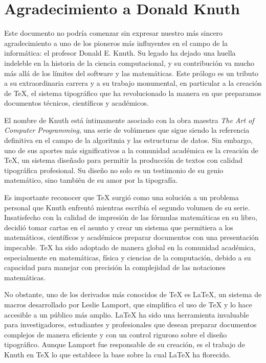
\chapter{Agradecimiento a Donald Knuth}

Este documento no podría comenzar sin expresar nuestro más sincero agradecimiento a uno de los pioneros más influyentes en el campo de la informática: el profesor Donald E. Knuth. Su legado ha dejado una huella indeleble en la historia de la ciencia computacional, y su contribución va mucho más allá de los límites del software y las matemáticas. Este prólogo es un tributo a su extraordinaria carrera y a su trabajo monumental, en particular a la creación de \TeX{}, el sistema tipográfico que ha revolucionado la manera en que preparamos documentos técnicos, científicos y académicos.

El nombre de Knuth está íntimamente asociado con la obra maestra \textit{The Art of Computer Programming}, una serie de volúmenes que sigue siendo la referencia definitiva en el campo de la algoritmia y las estructuras de datos. Sin embargo, uno de sus aportes más significativos a la comunidad académica es la creación de \TeX{}, un sistema diseñado para permitir la producción de textos con calidad tipográfica profesional. Su diseño no solo es un testimonio de su genio matemático, sino también de su amor por la tipografía.

Es importante reconocer que \TeX{} surgió como una solución a un problema personal que Knuth enfrentó mientras escribía el segundo volumen de su serie. Insatisfecho con la calidad de impresión de las fórmulas matemáticas en su libro, decidió tomar cartas en el asunto y crear un sistema que permitiera a los matemáticos, científicos y académicos preparar documentos con una presentación impecable. \TeX{} ha sido adoptado de manera global en la comunidad académica, especialmente en matemáticas, física y ciencias de la computación, debido a su capacidad para manejar con precisión la complejidad de las notaciones matemáticas.

No obstante, uno de los derivados más conocidos de \TeX{} es \LaTeX{}, un sistema de macros desarrollado por Leslie Lamport, que simplifica el uso de \TeX{} y lo hace accesible a un público más amplio. \LaTeX{} ha sido una herramienta invaluable para investigadores, estudiantes y profesionales que desean preparar documentos complejos de manera eficiente y con un control riguroso sobre el diseño tipográfico. Aunque Lamport fue responsable de su creación, es el trabajo de Knuth en \TeX{} lo que establece la base sobre la cual \LaTeX{} ha florecido.


